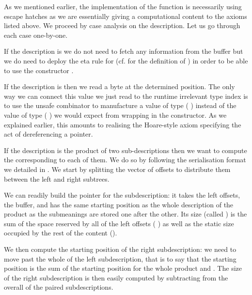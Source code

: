 As we mentioned earlier, the \idris{} implementation of the
 function
is necessarily using escape hatches as we are essentially
giving a computational content to the axioms listed above.
%
We proceed by case analysis on the description.
%
Let us go through each case one-by-one.


If the description is  we do not need to fetch any
information from the buffer but we do need to deploy the eta rule
for  (cf.  for the definition
of )
in order to be able to use the 
constructor .


If the description is  then we read a byte at the
determined position. The only way we can connect this value we just
read to the runtime irrelevant type index is to use the unsafe combinator
 to manufacture a value of type
( ) instead of the value of type
( )
we would expect from wrapping  in the  constructor.
%
As we explained earlier, this amounts to realising the
Hoare-style axiom specifying the act of dereferencing a pointer.

If the description is the product of two sub-descriptions then we
want to compute the  corresponding to
each of them.
%
We do so by following the serialisation format we detailed in
.
%
We start by splitting the vector of offsets to distribute them between
the left and right subtrees.

We can readily build the pointer for the  subdescription:
it takes the left offsets, the buffer, and has the same starting position
as the whole description of the product as the submeanings are stored one after the other.
Its size (called ) is the sum of the space reserved
by all of the left offsets ( )
as well as the static size occupied by the rest of the content
().

We then compute the starting position of the right subdescription: we need to
move past the whole of the left subdescription, that is to say that the starting
position is the sum of the starting position for the whole product and .
%
The size of the right subdescription is then easily computed by subtracting
 from the overall  of the paired subdescriptions.

